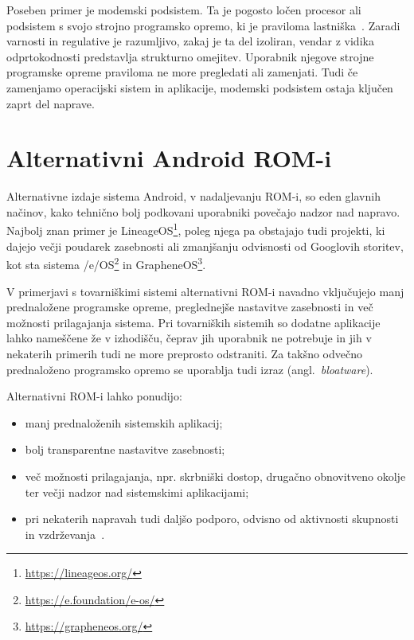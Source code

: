 \documentclass[a4paper,12pt,openright]{book}
\begin{document}
Poseben primer je modemski podsistem.
Ta je pogosto ločen procesor ali podsistem s svojo strojno programsko opremo, ki je praviloma lastniška~\cite{hernandez_firmwire_ndss2022,davis_cellular_baseband_security_2012}.
Zaradi varnosti in regulative je razumljivo, zakaj je ta del izoliran, vendar z vidika odprtokodnosti predstavlja strukturno omejitev.
Uporabnik njegove strojne programske opreme praviloma ne more pregledati ali zamenjati.
Tudi če zamenjamo operacijski sistem in aplikacije, modemski podsistem ostaja ključen zaprt del naprave.

\section{Alternativni Android ROM-i}
\label{sec:custom_rom}

Alternativne izdaje sistema Android, v nadaljevanju ROM-i, so eden glavnih načinov, kako tehnično bolj podkovani uporabniki povečajo nadzor nad napravo.
Najbolj znan primer je LineageOS\footnote{\url{https://lineageos.org/}}, poleg njega pa obstajajo tudi projekti, ki dajejo večji poudarek zasebnosti ali zmanjšanju odvisnosti od Googlovih storitev, kot sta sistema /e/OS\footnote{\url{https://e.foundation/e-os/}} in GrapheneOS\footnote{\url{https://grapheneos.org/}}.

V primerjavi s tovarniškimi sistemi alternativni ROM-i navadno vključujejo manj prednaložene programske opreme, preglednejše nastavitve zasebnosti in več možnosti prilagajanja sistema.
Pri tovarniških sistemih so dodatne aplikacije lahko nameščene že v izhodišču, čeprav jih uporabnik ne potrebuje in jih v nekaterih primerih tudi ne more preprosto odstraniti.
Za takšno odvečno prednaloženo programsko opremo se uporablja tudi izraz (angl.~\textit{bloatware}).

Alternativni ROM-i lahko ponudijo:
\begin{itemize}
  \item manj prednaloženih sistemskih aplikacij;
  \item bolj transparentne nastavitve zasebnosti;
  \item več možnosti prilagajanja, npr. skrbniški dostop, drugačno obnovitveno okolje ter večji nadzor nad sistemskimi aplikacijami;
  \item pri nekaterih napravah tudi daljšo podporo, odvisno od aktivnosti skupnosti in vzdrževanja~\cite{bradley_sustainable_security_2023}.
\end{itemize}
\end{document}
